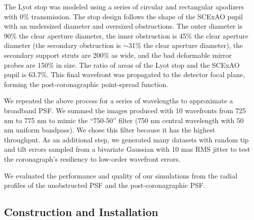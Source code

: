 \documentclass[12pt]{spieman}  %
\begin{document}
\begin{spacing}{2}
The Lyot stop was modeled using a series of circular and rectangular apodizers with 0\% transmission. The stop design follows the shape of the SCExAO pupil with an undersized diameter and oversized obstructions. The outer diameter is 90\% the clear aperture diameter, the inner obstruction is 45\% the clear aperture diameter (the secondary obstruction is $\sim$31\% the clear aperture diameter), the secondary support struts are 200\% as wide, and the bad deformable mirror probes are 150\% in size. The ratio of areas of the Lyot stop and the SCExAO pupil is 63.7\%. This final wavefront was propagated to the detector focal plane, forming the post-coronagraphic point-spread function.

We repeated the above process for a series of wavelengths to approximate a broadband PSF. We summed the images produced with 10 wavefronts from 725 nm to 775 nm to mimic the ``750-50'' filter (750 nm central wavelength with 50 nm uniform bandpass). We chose this filter because it has the highest throughput. As an additional step, we generated many datasets with random tip and tilt errors sampled from a bivariate Gaussian with 10 mas RMS jitter to test the coronagraph's resiliency to low-order wavefront errors.

We evaluated the performance and quality of our simulations from the radial profiles of the unobstructed PSF and the post-coronagraphic PSF.

\subsection{Construction and Installation}\label{sec:install}


\end{spacing}
\end{document}
